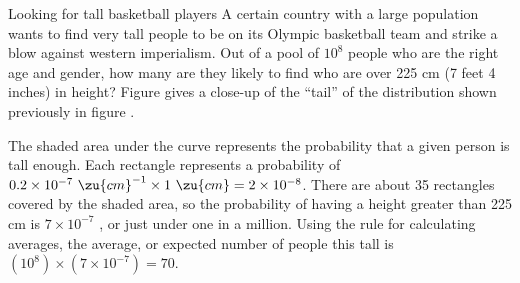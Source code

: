 \begin{eg}{Looking for tall basketball players}\label{eg:basketball}
\egquestion A certain country with a large population wants to
find very tall people to be on its Olympic basketball team
and strike a blow against western imperialism. Out of a pool
of $10^8$  people who are the right age and gender, how many
are they likely to find who are over 225 cm (7 feet 4 inches) in
height? Figure  gives a close-up of the ``tail'' of the
distribution shown previously in figure .

\eganswer The shaded area under the curve represents the
probability that a given person is tall enough. Each
rectangle represents a probability of
$0.2\times10^{-7}\ \zu{cm}^{-1} \times 1\ \zu{cm}=2\times10^{-8}$.
 There are about 35
rectangles covered by the shaded area, so the probability of
having a height greater than 225 cm is $7\times10^{-7}$ , or
just under one in a million. Using the rule for calculating
averages, the average, or expected number of people this
tall is $(10^8)\times(7\times10^{-7})=70$.
\end{eg}

